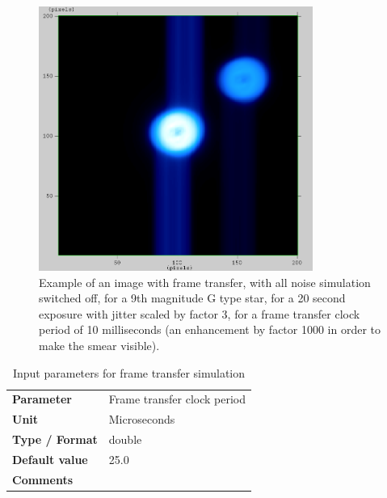\documentclass[11pt]{article}      %
\def\HCode#1{}
\def\htmlanchor#1{\HCode{<a id="#1"></a>}}
\begin{document}
\begin{figure}[hbtp]
  \begin{center}
    \includegraphics[width=0.8\textwidth]{frameTransfer_doubleSided.png}
    \caption{Example of an image with frame transfer, with all noise simulation switched off, for a 9th magnitude G type star, for a 20 second exposure with jitter scaled by factor 3, for a frame transfer clock period of 10 milliseconds (an enhancement by factor 1000 in order to make the smear visible).}
    \label{fig:frameTransfer}
  \end{center}
\end{figure}

\begin{table}[hb]
  \caption{Input parameters for frame transfer simulation}

  \htmlanchor{transferClockPeriod}
  \begin{tabular}{| l | p{13cm} |}
    \hline 
    {\bf Parameter} & Frame transfer clock period\\
    {\bf Unit} & Microseconds\\
    {\bf Type / Format} & double\\
    {\bf Default value} & 25.0\\
    {\bf Comments} & \\
    \hline
  \end{tabular}
  \bigskip

  \label{tab:frameTransfer}
\end{table}

\clearpage

\htmlanchor{PhotonNoiseGenerator}
\end{document}
